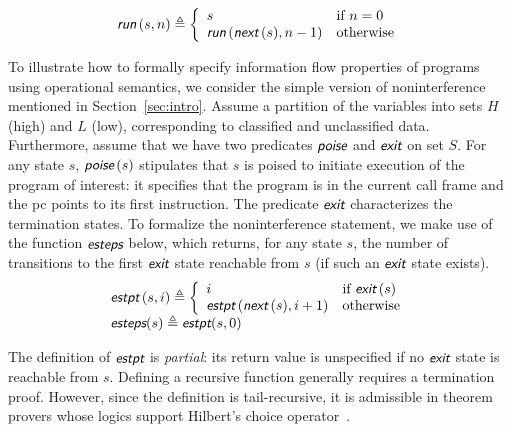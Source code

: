 \documentclass[conference]{IEEEtran}
\newcommand{\func}[1]{\ensuremath{\mbox{{\sf {\em #1}}}}}
\renewcommand{\cases}[1]{\ensuremath{\left\{\begin{array}{ll}#1\end{array}\right.}}
\begin{document}
\[
\func{run}\,(s,n)
\triangleq
\cases{
        s                              & \mbox{if $n=0$} \\
        \func{run}\,(\func{next}\,(s),n-1) & \mbox{otherwise} 
      }
\]

To illustrate how to formally specify information flow properties of
programs using operational semantics, we consider the simple version
of noninterference mentioned in Section~\ref{sec:intro}.  Assume a
partition of the variables into sets $H$ (high) and $L$ (low),
corresponding to classified and unclassified data.  Furthermore,
assume that we have two predicates \func{poise} and \func{exit} on
set $S$.  For any state $s$, $\func{poise}\,(s)$ stipulates that $s$
is poised to initiate execution of the program of interest: it
specifies that the program is in the current call frame and the pc
points to its first instruction.  The predicate \func{exit}
characterizes the termination states.  To formalize the
noninterference statement, we make use of the function \func{esteps}
below, which returns, for any state $s$, the number of transitions to
the first \func{exit} state reachable from $s$ (if such an \func{exit}
state exists).
\[
\begin{array}{l}
\func{estpt}\,(s,i)
\triangleq
\cases{
        i                              & \mbox{if $\func{exit}\,(s)$} \\
        \func{estpt}\,(\func{next}\,(s), i+1) & \mbox{otherwise} 
      }
\\
\func{esteps}(s) \triangleq\func{estpt}(s,0)
\end{array}
\]

\noindent
The definition of \func{estpt} is {\em partial}: its return value is
unspecified if no \func{exit} state is reachable from $s$.  Defining a
recursive function generally requires a termination proof.  However,
since the definition is tail-recursive, it is admissible in theorem
provers whose logics support Hilbert's choice
operator~\cite{jar:defpun}.
\end{document}
